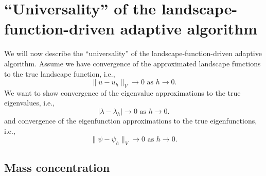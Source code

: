\documentclass[12pt]{amsart}
\begin{document}
\section{``Universality'' of the landscape-function-driven adaptive algorithm}

We will now describe the ``universality'' of the landscape-function-driven adaptive algorithm.
Assume we have convergence of the approximated landscape functions to the true landscape function, i.e.,
\begin{equation}
    \label{eq:convergence}
    \lVert u - u_h \rVert_{V} \to 0 \text{ as } h \to 0.
\end{equation}
We want to show convergence of the eigenvalue approximations to the true eigenvalues, i.e.,
\begin{equation}
    \label{eq:eigenvalue_convergence}
    \lvert \lambda - \lambda_h \rvert \to 0 \text{ as } h \to 0.
\end{equation}
and convergence of the eigenfunction approximations to the true eigenfunctions, i.e.,
\begin{equation}
    \label{eq:eigenfunction_convergence}
    \lVert \psi - \psi_h \rVert_{V} \to 0 \text{ as } h \to 0.
\end{equation}


\subsection{Mass concentration}
\end{document}
